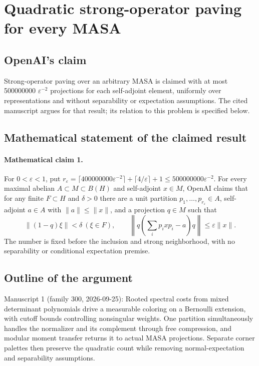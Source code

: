 \documentclass[11pt]{article}
\begin{document}
\section*{Quadratic strong-operator paving for every MASA}

\subsection{OpenAI's claim}
Strong-operator paving over an arbitrary MASA is claimed with at most 500000000 \(\varepsilon^{-2}\) projections for each self-adjoint element, uniformly over representations and without separability or expectation assumptions. The cited manuscript argues for that result; its relation to this problem is specified below.

\subsection{Mathematical statement of the claimed result}
\paragraph{Mathematical claim 1.} For $0<\varepsilon<1$, put $r_\varepsilon=\lceil400000000\varepsilon^{-2}\rceil+\lceil4/\varepsilon\rceil+1\le500000000\varepsilon^{-2}$. For every maximal abelian $A\subset M\subset B(H)$ and self-adjoint $x\in M$, OpenAI claims that for any finite $F\subset H$ and $\delta>0$ there are a unit partition $p_1,\ldots,p_{r_\varepsilon}\in A$, self-adjoint $a\in A$ with $\|a\|\le\|x\|$, and a projection $q\in M$ such that
\[
\|(1-q)\xi\|<\delta\ (\xi\in F),\qquad
\left\|q\left(\sum_ip_ixp_i-a\right)q\right\|\le\varepsilon\|x\|.
\]
The number is fixed before the inclusion and strong neighborhood, with no separability or conditional expectation premise.

\subsection{Outline of the argument}
Manuscript 1 (family 300, 2026-09-25): Rooted spectral costs from mixed determinant polynomials drive a measurable coloring on a Bernoulli extension, with cutoff bounds controlling nonsingular weights. One partition simultaneously handles the normalizer and its complement through free compression, and modular moment transfer returns it to actual MASA projections. Separate corner palettes then preserve the quadratic count while removing normal-expectation and separability assumptions.
\end{document}
